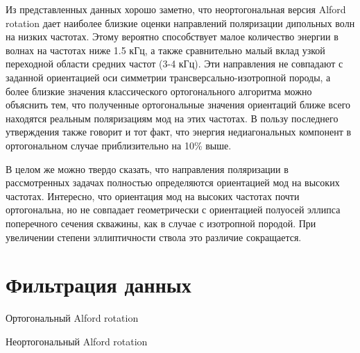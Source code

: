 \documentclass[a4paper,11pt]{article}
\begin{document}
Из представленных данных хорошо заметно, что неортогональная версия Alford rotation дает наиболее близкие оценки направлений поляризации дипольных волн на низких частотах. Этому вероятно способствует малое количество энергии в волнах на частотах ниже 1.5 кГц, а также сравнительно малый вклад узкой переходной области средних частот (3-4 кГц). Эти направления не совпадают с заданной ориентацией оси симметрии трансверсально-изотропной породы, а более близкие значения классического ортогонального алгоритма можно объяснить тем, что полученные ортогональные значения ориентаций ближе всего находятся реальным поляризациям мод на этих частотах. В пользу последнего утверждения также говорит и тот факт, что энергия недиагональных компонент в ортогональном случае приблизительно на 10\% выше. 

В целом же можно твердо сказать, что направления поляризации в рассмотренных задачах полностью определяются ориентацией мод на высоких частотах. Интересно, что ориентация мод на высоких частотах почти ортогональна, но не совпадает геометрически с ориентацией полуосей эллипса поперечного сечения скважины, как в случае с изотропной породой. При увеличении степени эллиптичности ствола это различие сокращается. 

\clearpage
%
%

%


%

\appendix
\section{Фильтрация данных}

\begin{minipage}[c]{0.47\linewidth}	
\begin{center}
		Ортогональный Alford rotation \\
	  		\label{fig:rot4_scheme}
\end{center}	  		
\end{minipage} \hfill
\begin{minipage}[c]{0.47\linewidth}
\begin{center}
		Неортогональный Alford rotation\\
			\label{fig:rot4_gs_scheme}
\end{center}
\end{minipage} 	\\
\end{document}
